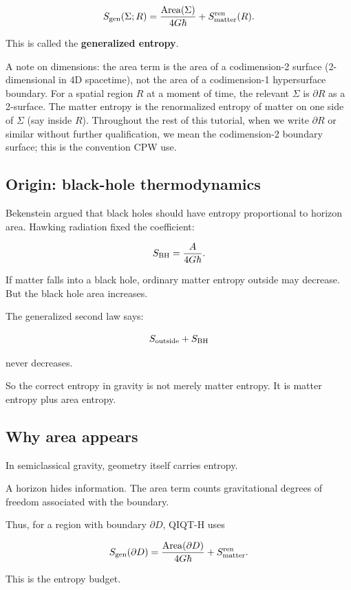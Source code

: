 \documentclass[11pt,a4paper]{article}
\begin{document}
\[
S_{\rm gen}(\Sigma; R)
=
\frac{\mathrm{Area}(\Sigma)}{4G\hbar}
+
S_{\rm matter}^{\rm ren}(R).
\]

This is called the \textbf{generalized entropy}.

A note on dimensions: the area term is the area of a codimension-2 surface (2-dimensional in 4D spacetime), not the area of a codimension-1 hypersurface boundary. For a spatial region $R$ at a moment of time, the relevant $\Sigma$ is $\partial R$ as a 2-surface. The matter entropy is the renormalized entropy of matter on one side of $\Sigma$ (say inside $R$). Throughout the rest of this tutorial, when we write $\partial R$ or similar without further qualification, we mean the codimension-2 boundary surface; this is the convention CPW use.

\subsection{Origin: black-hole thermodynamics}

Bekenstein argued that black holes should have entropy proportional to horizon area. Hawking radiation fixed the coefficient:

\[
S_{\rm BH}=\frac{A}{4G\hbar}.
\]

If matter falls into a black hole, ordinary matter entropy outside may decrease. But the black hole area increases.

The generalized second law says:

\[
S_{\rm outside}+S_{\rm BH}
\]

never decreases.

So the correct entropy in gravity is not merely matter entropy. It is matter entropy plus area entropy.

\subsection{Why area appears}

In semiclassical gravity, geometry itself carries entropy.

A horizon hides information. The area term counts gravitational degrees of freedom associated with the boundary.

Thus, for a region with boundary $\partial D$, QIQT-H uses

\[
S_{\rm gen}(\partial D)
=
\frac{\mathrm{Area}(\partial D)}{4G\hbar}
+
S_{\rm matter}^{\rm ren}.
\]

This is the entropy budget.
\end{document}
